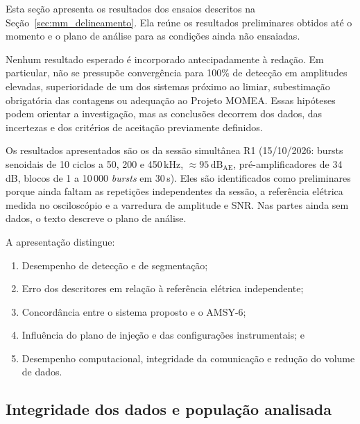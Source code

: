
Esta seção apresenta os resultados dos ensaios descritos na Seção~\ref{sec:mm_delineamento}. Ela reúne os resultados preliminares obtidos até o momento e o plano de análise para as condições ainda não ensaiadas.

Nenhum resultado esperado é incorporado antecipadamente à redação. Em particular, não se pressupõe convergência para 100\% de detecção em amplitudes elevadas, superioridade de um dos sistemas próximo ao limiar, subestimação obrigatória das contagens ou adequação ao Projeto MOMEA. Essas hipóteses podem orientar a investigação, mas as conclusões decorrem dos dados, das incertezas e dos critérios de aceitação previamente definidos.

Os resultados apresentados são os da sessão simultânea R1 (15/10/2026: bursts senoidais de 10 ciclos a 50, 200 e 450\,kHz, \(\approx 95\,\mathrm{dB}_{\mathrm{AE}}\), pré-amplificadores de 34\,dB, blocos de 1 a 10\,000 \textit{bursts} em 30\,s). Eles são identificados como preliminares porque ainda faltam as repetições independentes da sessão, a referência elétrica medida no osciloscópio e a varredura de amplitude e SNR. Nas partes ainda sem dados, o texto descreve o plano de análise.

A apresentação distingue:
\begin{enumerate}
	\item Desempenho de detecção e de segmentação;
	
	\item Erro dos descritores em relação à referência elétrica independente;
	
	\item Concordância entre o sistema proposto e o AMSY-6;
	
	\item Influência do plano de injeção e das configurações instrumentais; e
	
	\item Desempenho computacional, integridade da comunicação e redução do volume de dados.
\end{enumerate}

\subsection{Integridade dos dados e população analisada}
\label{v2:subsec:integridade_resultados}

